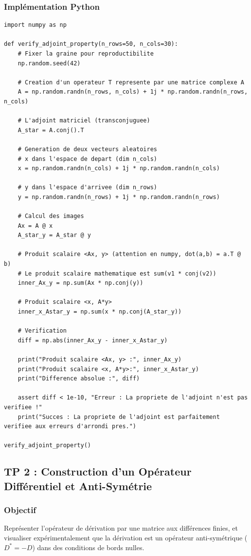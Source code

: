 \documentclass[11pt,a4paper]{article}
\begin{document}
\subsubsection*{Implémentation Python}
\begin{lstlisting}
import numpy as np

def verify_adjoint_property(n_rows=50, n_cols=30):
    # Fixer la graine pour reproductibilite
    np.random.seed(42)

    # Creation d'un operateur T represente par une matrice complexe A
    A = np.random.randn(n_rows, n_cols) + 1j * np.random.randn(n_rows, n_cols)

    # L'adjoint matriciel (transconjuguee)
    A_star = A.conj().T

    # Generation de deux vecteurs aleatoires
    # x dans l'espace de depart (dim n_cols)
    x = np.random.randn(n_cols) + 1j * np.random.randn(n_cols)

    # y dans l'espace d'arrivee (dim n_rows)
    y = np.random.randn(n_rows) + 1j * np.random.randn(n_rows)

    # Calcul des images
    Ax = A @ x
    A_star_y = A_star @ y

    # Produit scalaire <Ax, y> (attention en numpy, dot(a,b) = a.T @ b)
    # Le produit scalaire mathematique est sum(v1 * conj(v2))
    inner_Ax_y = np.sum(Ax * np.conj(y))

    # Produit scalaire <x, A*y>
    inner_x_Astar_y = np.sum(x * np.conj(A_star_y))

    # Verification
    diff = np.abs(inner_Ax_y - inner_x_Astar_y)

    print("Produit scalaire <Ax, y> :", inner_Ax_y)
    print("Produit scalaire <x, A*y>:", inner_x_Astar_y)
    print("Difference absolue :", diff)

    assert diff < 1e-10, "Erreur : La propriete de l'adjoint n'est pas verifiee !"
    print("Succes : La propriete de l'adjoint est parfaitement verifiee aux erreurs d'arrondi pres.")

verify_adjoint_property()
\end{lstlisting}


\subsection*{TP 2 : Construction d'un Opérateur Différentiel et Anti-Symétrie}
\subsubsection*{Objectif}
Représenter l'opérateur de dérivation par une matrice aux différences finies, et visualiser expérimentalement que la dérivation est un opérateur anti-symétrique ($D^* = -D$) dans des conditions de bords nulles.
\end{document}
